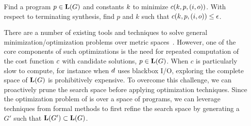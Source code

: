 Find a program $p \in \mathbf{L}(G)$ and constants ${k}$ to minimize ${c}({k},p,(i,o))$. 
With respect to terminating synthesis, find $p$ and $k$ such that ${c}({k},p,(i,o)) \leq \epsilon$.
\vspace{\baselineskip}

There are a number of existing tools and techniques to solve general minimization/optimization problems over metric spaces~\cite{optmizationTextbook}.
However, one of the core components of such optimizations is the need for repeated computation of the cost function ${c}$ with candidate solutions, $p \in \mathbf{L}(G)$.
When $c$ is particularly slow to compute, for instance when ${d}$ uses blackbox I/O, exploring the complete space of $\mathbf{L}(G)$ is prohibitively expensive.
To overcome this challenge, we can proactively prune the search space before applying optimization techniques.
Since the optimization problem of \approximatePBE is over a space of programs, we can leverage techniques from formal methods to first refine the search space by generating a $G'$ such that $\mathbf{L}(G') \subset \mathbf{L}(G)$.
